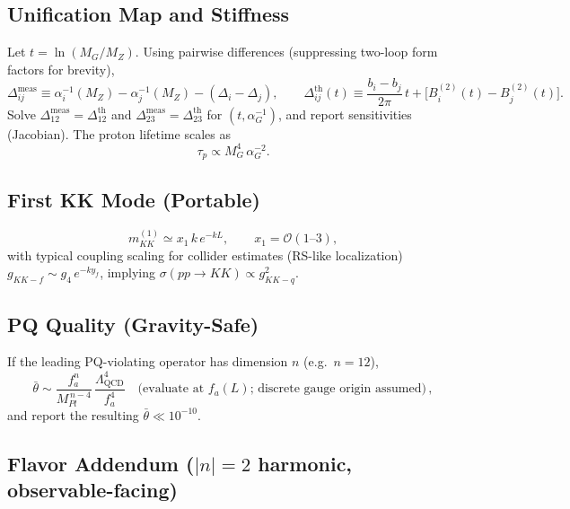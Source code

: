 \documentclass[11pt]{article}
\begin{document}
\subsection{Unification Map and Stiffness}

Let $t=\ln(M_G/M_Z)$. Using pairwise differences (suppressing two-loop form factors for brevity),
\begin{equation}
\Delta^{\mathrm{meas}}_{ij} \equiv \alpha_i^{-1}(M_Z) - \alpha_j^{-1}(M_Z) - (\Delta_i - \Delta_j), 
\qquad
\Delta^{\mathrm{th}}_{ij}(t) \equiv \frac{b_i - b_j}{2\pi}\, t + \big[B^{(2)}_i(t) - B^{(2)}_j(t)\big].
\end{equation}
Solve $\Delta^{\mathrm{meas}}_{12}=\Delta^{\mathrm{th}}_{12}$ and $\Delta^{\mathrm{meas}}_{23}=\Delta^{\mathrm{th}}_{23}$ for $(t,\alpha_G^{-1})$, and report sensitivities (Jacobian). The proton lifetime scales as
\begin{equation}
\tau_p \propto M_G^4\, \alpha_G^{-2}.
\end{equation}

\subsection{First KK Mode (Portable)}

\begin{equation}
m^{(1)}_{KK} \simeq x_1\, k\, e^{-kL}, \qquad x_1=\mathcal{O}(1\text{--}3),
\end{equation}
with typical coupling scaling for collider estimates (RS-like localization) $g_{KK-f}\sim g_4\, e^{-k y_f}$, implying $\sigma(pp\to KK)\propto g_{KK-q}^2$.

\subsection{PQ Quality (Gravity-Safe)}

If the leading PQ-violating operator has dimension $n$ (e.g.\ $n=12$),
\begin{equation}
\bar{\theta} \sim \frac{f_a^n}{M_{Pl}^{\,n-4}}\, \frac{\Lambda_{\mathrm{QCD}}^4}{f_a^4}
\quad \text{(evaluate at $f_a(L)$; discrete gauge origin assumed)}\, ,
\end{equation}
and report the resulting $\bar{\theta}\ll 10^{-10}$.

\subsection{Flavor Addendum ($|n|=2$ harmonic, observable-facing)}
\end{document}
